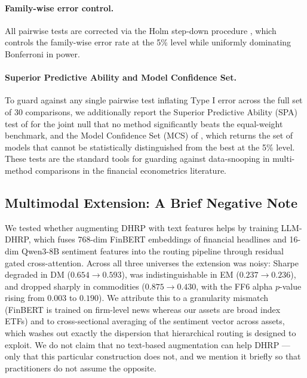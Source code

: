 \paragraph{Family-wise error control.} All pairwise tests are corrected via the Holm step-down procedure \citep{Holm1979}, which controls the family-wise error rate at the 5\% level while uniformly dominating Bonferroni in power.

\paragraph{Superior Predictive Ability and Model Confidence Set.} To guard against any single pairwise test inflating Type I error across the full set of 30 comparisons, we additionally report the Superior Predictive Ability (SPA) test of \citet{Hansen2005} for the joint null that no method significantly beats the equal-weight benchmark, and the Model Confidence Set (MCS) of \citet{HansenLundeNason2011}, which returns the set of models that cannot be statistically distinguished from the best at the 5\% level. These tests are the standard tools for guarding against data-snooping in multi-method comparisons in the financial econometrics literature.

\subsection{Multimodal Extension: A Brief Negative Note}
\label{sec:llmablation}

We tested whether augmenting DHRP with text features helps by training LLM-DHRP, which fuses 768-dim FinBERT \citep{Huang2023} embeddings of financial headlines and 16-dim Qwen3-8B \citep{Qwen2025} sentiment features into the routing pipeline through residual gated cross-attention. Across all three universes the extension was noisy: Sharpe degraded in DM ($0.654 \to 0.593$), was indistinguishable in EM ($0.237 \to 0.236$), and dropped sharply in commodities ($0.875 \to 0.430$, with the FF6 alpha $p$-value rising from $0.003$ to $0.190$). We attribute this to a granularity mismatch (FinBERT is trained on firm-level news whereas our assets are broad index ETFs) and to cross-sectional averaging of the sentiment vector across assets, which washes out exactly the dispersion that hierarchical routing is designed to exploit. We do not claim that no text-based augmentation can help DHRP --- only that this particular construction does not, and we mention it briefly so that practitioners do not assume the opposite.

